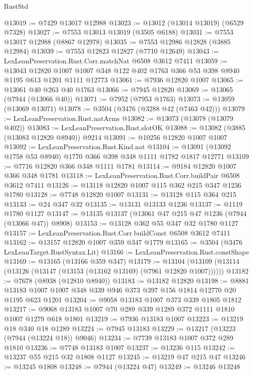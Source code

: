 \begin{lexlean}{RustStd}
\begin{coremodule}
@13019 := @7429 @13017 @12988
@13023 := @13012 (@13014 @13019) (@6529 @7328)
@13027 := @7553 @13013 @13019 (@3505 @6188)
@13031 := @7553 @13017 @12988 (@8867 @12978)
@13035 := @7553 @12986 @12828 (@3885 @12984)
@13039 := @7553 @12823 @12827 (@7710 @12649)
@13043 := LexLeanPreservation.Rust.Corr.matchNat @6508 @3612 @7411
@13059 := @13043
    @12820
    @1007
    @1007
    @348
    @122
    @402
    @1763
    @366
    @53
    @398
    @8940
    @1195
    @613
    @1201
    @1111
    @12773
@13061 := @7936 @12820 @1007
@13065 := @13061 @40 @263 @40 @1763
@13066 := @7945 @12820
@13069 := @13065 (@7944 (@13066 @40))
@13071 := @7952 (@7953 @1763)
@13073 := @13059 (@13069 @13071)
@13078 := @3504 (@3476 (@3288 @42 (@7463 @42)))
@13079 := LexLeanPreservation.Rust.natArms
@13082 := @13073 (@13078 (@13079 @402))
@13083 := LexLeanPreservation.Rust.slotOK
@13088 := @13082 (@3885 (@13083 @12820 @8940)) @9214
@13091 := @10256 @12820 @1007 @1007
@13092 := LexLeanPreservation.Rust.Kind.nat
@13104 := @13091 (@13092 @1758 @53 @8940) @1770 @366 @398 @348 @1111 @1782 @1817 @12771
@13109 := @7716 @12820 @366 @348 @1111 @1781
@13114 := @9184 @12820 @1007 @366 @348 @1781
@13118 := LexLeanPreservation.Rust.Corr.buildPair @6508 @3612 @7411
@13126 := @13118 @12820 @1007 @115 @362 @215 @347 @1236 @1780
@13128 := @7748 @12820 @1007
@13131 := @13128 @115 @364 @215
@13133 := @24 @347 @32
@13135 := @13131 @13133 @1236
@13137 := @1119 @1780 @1127
@13147 := @13135 @13137 (@13061 @47 @215 @47 @1236 (@7944 (@13066 @47)) @8908)
@13153 := @13128 @362 @55 @347 @32 @1780 @1127
@13157 := LexLeanPreservation.Rust.Corr.buildConst @6508 @3612 @7411
@13162 := @13157 @12820 @1007 @359 @347 @1779
@13165 := @3504 (@3476 LexLeanTarget.RustSyntax.Lit)
@13166 := LexLeanPreservation.Rust.constShape
@13169 := @13165 (@13166 @359 @347)
@13179 := @13104 (@13109 (@13114 (@13126 (@13147 (@13153 (@13162 @13169) (@7961 @12820 @1007))))))
@13182 := @7678 (@8938 (@12810 @8940))
@13183 := @13182 @12820
@13198 := @8881 @13183 @1007 @1007 @348 @339 @946 @373 @397 @156 @1814 @12770 @20 @1195 @623 @1201
@13204 := @9058 @13183 @1007 @373 @339 @1805 @1812
@13217 := @9068 @13183 @1007 @70 @289 @339 @1289 @372 @1111 @1810 @1007 @1279 @618 @1801
@13219 := @7936 @13183 @1007
@13223 := @13219 @18 @340 @18 @1289
@13224 := @7945 @13183
@13229 := @13217 (@13223 (@7944 (@13224 @18)) @9046)
@13234 := @7739 @13183 @1007 @372 @289 @1810
@13236 := @7748 @13183 @1007
@13237 := @13236 @115
@13242 := @13237 @55 @215 @32 @1808 @1127
@13245 := @13219 @47 @215 @47
@13246 := @13245 @1808
@13248 := @7944 (@13224 @47)
@13249 := @13246 @13248

\end{coremodule}
\end{lexlean}
